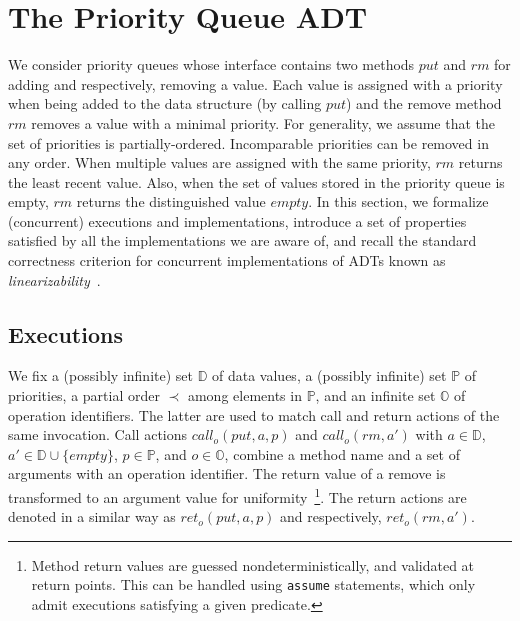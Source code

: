\documentclass[a4paper,UKenglish]{lipics-v2016}
\begin{document}
 
\newcommand{\seqPQ}{\mathsf{SeqPQ}}

\section{The Priority Queue ADT}
\label{sec:priority queue and data-independence}

We consider priority queues whose interface contains two methods $\textit{put}$ and $\textit{rm}$ for adding and respectively, removing a value. Each value is assigned with a priority when being added to the data structure (by calling $\textit{put}$) and the remove method $\textit{rm}$ removes a value with a minimal priority. For generality, we assume that the set of priorities is partially-ordered. Incomparable priorities can be removed in any order. When multiple values are assigned with the same priority, $\textit{rm}$ returns the least recent value. Also, when the set of values stored in the priority queue is empty, $\textit{rm}$ returns the distinguished value $\textit{empty}$. In this section, we formalize (concurrent) executions and implementations, introduce a set of properties satisfied by all the implementations we are aware of, and recall the standard correctness criterion for concurrent implementations of ADTs known as \emph{linearizability}~\cite{journals/toplas/HerlihyW90}.

\subsection{Executions}\label{ssec:exec}

We fix a (possibly infinite) set $\mathbb{D}$ of data values, a (possibly infinite) set $\mathbb{P}$ of priorities, a partial order $\prec$ among elements in $\mathbb{P}$, and an infinite set $\mathbb{O}$ of operation identifiers.
The latter are used to match call and return actions of the same invocation. Call actions $\textit{call}_o(\textit{put},a,p)$ and $\textit{call}_o(\textit{rm},a')$ with $a\in \mathbb{D}$, $a'\in \mathbb{D}\cup\{\textit{empty}\}$, $p \in \mathbb{P}$, and $o \in \mathbb{O}$, combine a method name and a set of arguments with an operation identifier. The return value of a remove is transformed to an argument value for uniformity~\footnote{Method return values are guessed nondeterministically, and validated at return points.
This can be handled using {\tt assume} statements, which only admit executions satisfying a given predicate.}.
The return actions are denoted in a similar way as $\textit{ret}_o(\textit{put},a,p)$ and respectively, $\textit{ret}_o(\textit{rm},a')$.
\end{document}
